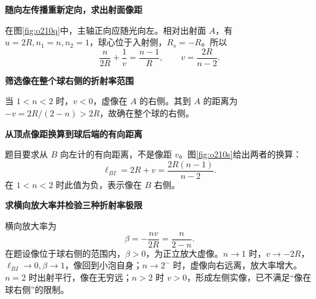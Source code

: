 \begin{solution}\textbf{随向左传播重新定向，求出射面像距}\par\nobreak
在图\ref{fig:o210q}中，主轴正向应随光向左。相对出射面 \(A\)，有
\(u=2R,n_1=n,n_2=1\)，球心位于入射侧，\(R_{\!s}=-R\)。所以
\[
 \frac n{2R}+\frac1v=\frac{n-1}R,\qquad
 \boxed{v=\frac{2R}{n-2}}.
\]


\par\medskip{}\noindent\textbf{筛选像在整个球右侧的折射率范围}\par\nobreak
当 \(1<n<2\) 时，\(v<0\)，虚像在 \(A\) 的右侧。其到 \(A\) 的距离为 \(-v=2R/(2-n)>2R\)，故确在整个球的右侧。



\par\medskip{}\noindent\textbf{从顶点像距换算到球后端的有向距离}\par\nobreak
题目要求从 \(B\) 向左计的有向距离，不是像距 \(v\)。图\ref{fig:o210s}给出两者的换算：
\[
 \boxed{\ell_{BI}=2R+v
 =\frac{2R(n-1)}{n-2}}.
\]
在 \(1<n<2\) 时此值为负，表示像在 \(B\) 右侧。



\par\medskip{}\noindent\textbf{求横向放大率并检验三种折射率极限}\par\nobreak
横向放大率为
\[
 \boxed{\beta=-\frac{nv}{2R}=\frac n{2-n}}.
\]
在题设像位于球右侧的范围内，\(\beta>0\)，为正立放大虚像。\(n\to1\) 时，\(v\to-2R\)，\(\ell_{BI}\to0,\beta\to1\)，像回到小泡自身；\(n\to2^-\) 时，虚像向右远离，放大率增大。\(n=2\) 时出射平行，像在无穷远；\(n>2\) 时 \(v>0\)，形成左侧实像，已不满足“像在球右侧”的限制。
\end{solution}

